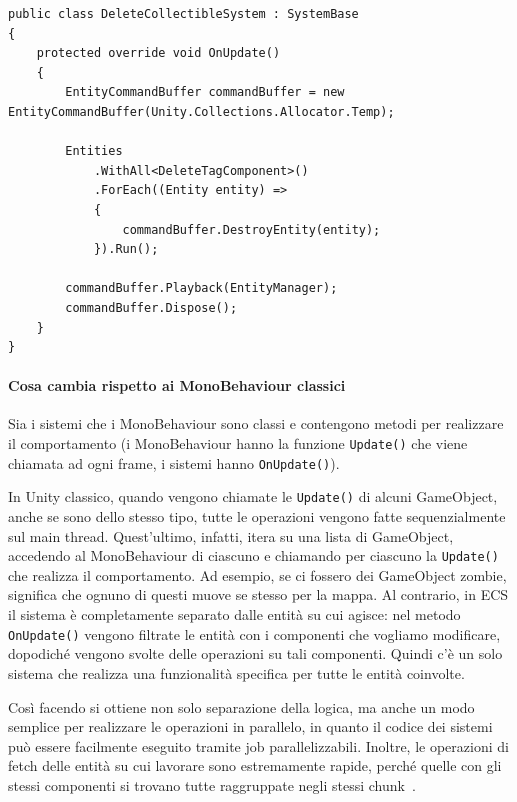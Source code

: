\begin{lstlisting}[caption={Prototipo: sistema che elimina tutte le entità che possiedono il componente \UseVerb{DeleteTagComponentTerm}, utilizzando un \UseVerb{EntityCommandBufferTerm}.},label={lst:system-simple-example},language={[Sharp]C}]
public class DeleteCollectibleSystem : SystemBase
{
    protected override void OnUpdate()
    {
        EntityCommandBuffer commandBuffer = new EntityCommandBuffer(Unity.Collections.Allocator.Temp);

        Entities
            .WithAll<DeleteTagComponent>()
            .ForEach((Entity entity) =>
            {
                commandBuffer.DestroyEntity(entity);
            }).Run();

        commandBuffer.Playback(EntityManager);
        commandBuffer.Dispose();
    }
}
\end{lstlisting}

\paragraph{Cosa cambia rispetto ai MonoBehaviour classici}
Sia i sistemi che i MonoBehaviour sono classi e contengono metodi per realizzare il comportamento (i MonoBehaviour hanno la funzione \verb|Update()| che viene chiamata ad ogni frame, i sistemi hanno \verb|OnUpdate()|).

In Unity classico, quando vengono chiamate le \verb|Update()| di alcuni GameObject, anche se sono dello stesso tipo, tutte le operazioni vengono fatte sequenzialmente sul main thread. Quest'ultimo, infatti, itera su una lista di GameObject, accedendo al MonoBehaviour di ciascuno e chiamando per ciascuno la \verb|Update()| che realizza il comportamento. Ad esempio, se ci fossero dei GameObject zombie, significa che ognuno di questi muove se stesso per la mappa.
Al contrario, in ECS il sistema è completamente separato dalle entità su cui agisce: nel metodo \verb|OnUpdate()| vengono filtrate le entità con i componenti che vogliamo modificare, dopodiché vengono svolte delle operazioni su tali componenti. Quindi c'è un solo sistema che realizza una funzionalità specifica per tutte le entità coinvolte.

Così facendo si ottiene non solo separazione della logica, ma anche un modo semplice per realizzare le operazioni in parallelo, in quanto il codice dei sistemi può essere facilmente eseguito tramite job parallelizzabili. Inoltre, le operazioni di fetch delle entità su cui lavorare sono estremamente rapide, perché quelle con gli stessi componenti si trovano tutte raggruppate negli stessi chunk~\cite{youtube:differenze-unity-classico}.


